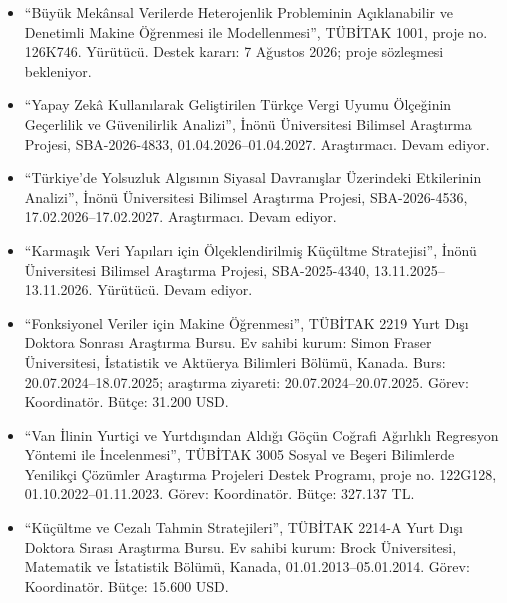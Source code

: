 \documentclass[10pt,a4paper]{article}
\begin{document}
\begin{itemize}

\item ``Büyük Mekânsal Verilerde Heterojenlik Probleminin Açıklanabilir ve Denetimli Makine Öğrenmesi ile Modellenmesi'', TÜBİTAK 1001, proje no. 126K746. Yürütücü. Destek kararı: 7 Ağustos 2026; proje sözleşmesi bekleniyor.

\item ``Yapay Zekâ Kullanılarak Geliştirilen Türkçe Vergi Uyumu Ölçeğinin Geçerlilik ve Güvenilirlik Analizi'', İnönü Üniversitesi Bilimsel Araştırma Projesi, SBA-2026-4833, 01.04.2026--01.04.2027. Araştırmacı. Devam ediyor.

\item ``Türkiye'de Yolsuzluk Algısının Siyasal Davranışlar Üzerindeki Etkilerinin Analizi'', İnönü Üniversitesi Bilimsel Araştırma Projesi, SBA-2026-4536, 17.02.2026--17.02.2027. Araştırmacı. Devam ediyor.

\item ``Karmaşık Veri Yapıları için Ölçeklendirilmiş Küçültme Stratejisi'', İnönü Üniversitesi Bilimsel Araştırma Projesi, SBA-2025-4340, 13.11.2025--13.11.2026. Yürütücü. Devam ediyor.




\item ``Fonksiyonel Veriler için Makine Öğrenmesi'', TÜBİTAK 2219 Yurt Dışı Doktora Sonrası Araştırma Bursu. Ev sahibi kurum: Simon Fraser Üniversitesi, İstatistik ve Aktüerya Bilimleri Bölümü, Kanada. Burs: 20.07.2024--18.07.2025; araştırma ziyareti: 20.07.2024--20.07.2025. Görev: Koordinatör. Bütçe: 31.200 USD.

\item ``Van İlinin Yurtiçi ve Yurtdışından Aldığı Göçün Coğrafi Ağırlıklı Regresyon Yöntemi ile İncelenmesi'', TÜBİTAK 3005 Sosyal ve Beşeri Bilimlerde Yenilikçi Çözümler Araştırma Projeleri Destek Programı, proje no. 122G128, 01.10.2022--01.11.2023. Görev: Koordinatör. Bütçe: 327.137 TL.

\item ``Küçültme ve Cezalı Tahmin Stratejileri'', TÜBİTAK 2214-A Yurt Dışı Doktora Sırası Araştırma Bursu. Ev sahibi kurum: Brock Üniversitesi, Matematik ve İstatistik Bölümü, Kanada, 01.01.2013--05.01.2014. Görev: Koordinatör. Bütçe: 15.600 USD.


\end{itemize}
\end{document}

